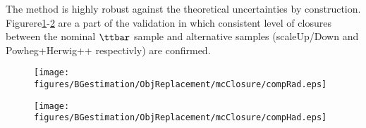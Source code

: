 
\clearpage
The method is highly robust against the theoretical uncertainties by construction. Figurere\ref{fig::Uncertainties::objRep_theoSys_compRad}-\ref{fig::Uncertainties::objRep_theoSys_compHad} are a part of the validation in which consistent level of closures between the nominal $\ttbar$ sample and alternative samples (scaleUp/Down and Powheg+Herwig++ respectivly) are confirmed.

\begin{figure}
  \begin{center}
    \texttt{[image: figures/BGestimation/ObjReplacement/mcClosure/compRad.eps]}
    \label{fig::Uncertainties::objRep_theoSys_compRad}
  \end{center}
\end{figure}
\begin{figure}
  \begin{center}
    \texttt{[image: figures/BGestimation/ObjReplacement/mcClosure/compHad.eps]}
    \label{fig::Uncertainties::objRep_theoSys_compHad}
  \end{center}
\end{figure}

